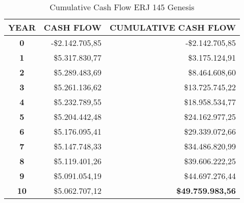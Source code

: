\begin{table}[H]
  \scriptsize
  \centering
  \caption{Cumulative Cash Flow ERJ 145 Genesis}
    \begin{tabular}{crr}
    \toprule
    \textbf{YEAR} & \multicolumn{1}{c}{\textbf{CASH FLOW}} & \multicolumn{1}{c}{\textbf{CUMULATIVE CASH FLOW}} \\
    \midrule
    \textbf{0} & -\$2.142.705,85 & -\$2.142.705,85 \\
    \textbf{1} & \$5.317.830,77 & \$3.175.124,91 \\
    \textbf{2} & \$5.289.483,69 & \$8.464.608,60 \\
    \textbf{3} & \$5.261.136,62 & \$13.725.745,22 \\
    \textbf{4} & \$5.232.789,55 & \$18.958.534,77 \\
    \textbf{5} & \$5.204.442,48 & \$24.162.977,25 \\
    \textbf{6} & \$5.176.095,41 & \$29.339.072,66 \\
    \textbf{7} & \$5.147.748,33 & \$34.486.820,99 \\
    \textbf{8} & \$5.119.401,26 & \$39.606.222,25 \\
    \textbf{9} & \$5.091.054,19 & \$44.697.276,44 \\
    \textbf{10} & \$5.062.707,12 & \textbf{\$49.759.983,56} \\
    \bottomrule
    \end{tabular}%
  \label{tab:CumulCash}%
\end{table}%


